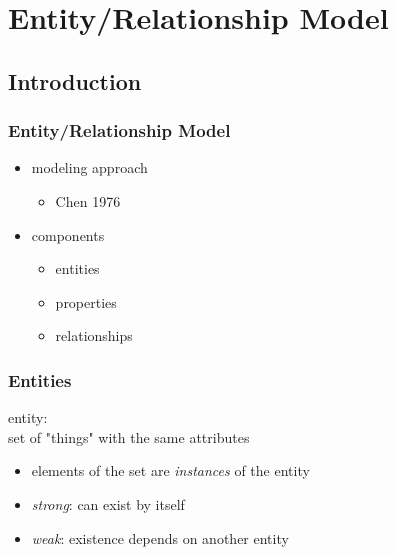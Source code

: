 \documentclass[dvipsnames]{beamer}
\begin{document}
\section{Entity/Relationship Model}

\subsection{Introduction}

\begin{frame}
  \frametitle{Entity/Relationship Model}

  \begin{itemize}
    \item modeling approach
    \begin{itemize}
      \item Chen 1976
    \end{itemize}

    \pause
    \item components
    \begin{itemize}
      \item entities
      \item properties
      \item relationships
    \end{itemize}
  \end{itemize}
\end{frame}

\begin{frame}
  \frametitle{Entities}

  \begin{definition}
    \alert{entity}:\\
      set of "things" with the same attributes

    \pause
    \begin{itemize}
      \item elements of the set are \emph{instances} of the entity
    \end{itemize}

    \pause
    \begin{itemize}
      \item \emph{strong}: can exist by itself
      \item \emph{weak}: existence depends on another entity
    \end{itemize}
  \end{definition}
\end{frame}
\end{document}
